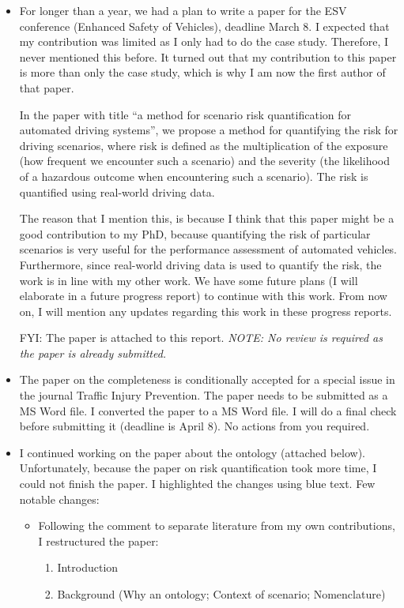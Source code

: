 \documentclass[10pt,final,a4paper,oneside,onecolumn]{article}
\begin{document}
\begin{itemize}
	\item For longer than a year, we had a plan to write a paper for the ESV conference (Enhanced Safety of Vehicles), deadline March 8. I expected that my contribution was limited as I only had to do the case study. Therefore, I never mentioned this before. It turned out that my contribution to this paper is more than only the case study, which is why I am now the first author of that paper. 
	
	In the paper with title ``a method for scenario risk quantification for automated driving systems'', we propose a method for quantifying the risk for driving scenarios, where risk is defined as the multiplication of the exposure (how frequent we encounter such a scenario) and the severity (the likelihood of a hazardous outcome when encountering such a scenario). The risk is quantified using real-world driving data.
	
	The reason that I mention this, is because I think that this paper might be a good contribution to my PhD, because quantifying the risk of particular scenarios is very useful for the performance assessment of automated vehicles. Furthermore, since real-world driving data is used to quantify the risk, the work is in line with my other work. We have some future plans (I will elaborate in a future progress report) to continue with this work. From now on, I will mention any updates regarding this work in these progress reports.
	
	FYI: The paper is attached to this report. \emph{NOTE: No review is required as the paper is already submitted.}
	
	\item The paper on the completeness is conditionally accepted for a special issue in the journal Traffic Injury Prevention. The paper needs to be submitted as a MS Word file. I converted the paper to a MS Word file. I will do a final check before submitting it (deadline is April 8). No actions from you required.
	
	\item I continued working on the paper about the ontology (attached below). Unfortunately, because the paper on risk quantification took more time, I could not finish the paper. I highlighted the changes using blue text. Few notable changes:
	\begin{itemize}
		\item Following the comment to separate literature from my own contributions, I restructured the paper:
		\begin{enumerate}
			\item Introduction
			\item Background (Why an ontology; Context of scenario; Nomenclature)
			

\end{enumerate}
\end{itemize}
\end{itemize}
\end{document}

